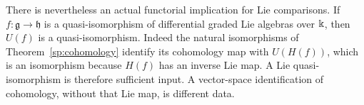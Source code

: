 There is nevertheless an actual functorial implication for
Lie comparisons.  If $f:\mathfrak g\to\mathfrak h$ is a
quasi-isomorphism of differential graded Lie algebras over
$\Bbbk$, then $U(f)$ is a quasi-isomorphism.
Indeed the natural isomorphisms of Theorem~\ref{sp:cohomology}
identify its cohomology map with $U(H(f))$, which is an
isomorphism because $H(f)$ has an inverse Lie map.
A Lie quasi-isomorphism is therefore sufficient input.
A vector-space identification of cohomology, without that
Lie map, is different data.

